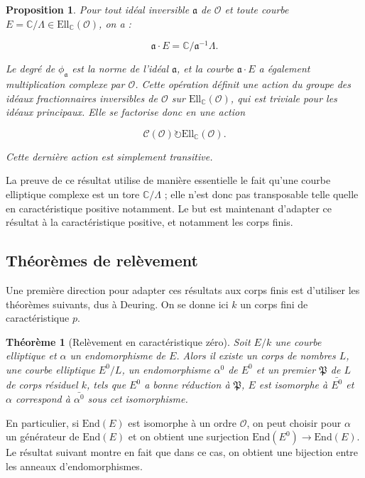 \documentclass[11pt,a4paper]{article}
\newcommand{\C}{\mathbb{C}}
\renewcommand{\O}{\mathcal{O}}
\newcommand{\Cl}{\mathcal{C}}
\newcommand{\vers}{\longrightarrow}
\newcommand{\End}{\mathrm{End}}
\newcommand{\Ell}{\mathrm{Ell}}
\renewcommand{\frak}{\mathfrak}
\newtheorem*{thm}{Théorème}
\newtheorem*{prop}{Proposition}
\theoremstyle{definition}
\begin{document}
\begin{prop}

Pour tout idéal inversible $\frak a$ de $\O$ et toute courbe $E=\C/\Lambda\in \Ell_\C(\O)$, on a :

$$\frak a\cdot E = \C/\frak a^{-1} \Lambda.$$

Le degré de $\phi_{\frak a}$ est la norme de l'idéal $\frak a$, et la courbe $\frak a\cdot E$ a également multiplication complexe par $\O$. Cette opération définit une action du groupe des idéaux fractionnaires inversibles de $\O$ sur $\Ell_\C(\O)$, qui est triviale pour les idéaux principaux. Elle se factorise donc en une action

$$\Cl(\O) \circlearrowright \Ell_\C(\O).$$

Cette dernière action est simplement transitive.

\end{prop}

La preuve de ce résultat utilise de manière essentielle le fait qu'une courbe elliptique complexe est un tore $\C/\Lambda$ ; elle n'est donc pas transposable telle quelle en caractéristique positive notamment. Le but est maintenant d'adapter ce résultat à la caractéristique positive, et notamment les corps finis.




\subsection{Théorèmes de relèvement}


Une première direction pour adapter ces résultats aux corps finis est d'utiliser les théorèmes suivants, dus à Deuring. On se donne ici $k$ un corps fini de caractéristique $p$.


\begin{thm}[Relèvement en caractéristique zéro]

Soit $E/k$ une courbe elliptique et $\alpha$ un endomorphisme de $E$. Alors il existe un corps de nombres $L$, une courbe elliptique $E^0/L$, un endomorphisme $\alpha^0$ de $E^0$ et un premier $\frak P$ de $L$ de corps résiduel $k$, tels que $E^0$ a bonne réduction à $\frak P$, $E$ est isomorphe à $\bar{E^0}$ et $\alpha$ correspond à $\bar{\alpha^0}$ sous cet isomorphisme.

\end{thm}

En particulier, si $\End(E)$ est isomorphe à un ordre $\O$, on peut choisir pour $\alpha$ un générateur de $\End(E)$ et on obtient une surjection $\End(E^0)\vers \End(E).$ Le résultat suivant montre en fait que dans ce cas, on obtient une bijection entre les anneaux d'endomorphismes.
\end{document}
